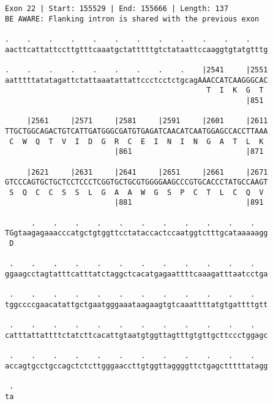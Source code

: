 \documentclass{article}
\begin{document}
\begin{Verbatim}[fontfamily=courier]
Exon 22 | Start: 155529 | End: 155666 | Length: 137
BE AWARE: Flanking intron is shared with the previous exon

.    .    .    .    .    .    .    .    .    .    .    .    
aacttcattattccttgtttcaaatgctatttttgtctataattccaaggtgtatgtttg

.    .    .    .    .    .    .    .    .    |2541     |2551
aatttttatatagattctattaaatattattccctcctctgcagAAACCATCAAGGGCAC
                                              T  I  K  G  T 
                                                       |851 

     |2561     |2571     |2581     |2591     |2601     |2611
TTGCTGGCAGACTGTCATTGATGGGCGATGTGAGATCAACATCAATGGAGCCACCTTAAA
 C  W  Q  T  V  I  D  G  R  C  E  I  N  I  N  G  A  T  L  K 
                         |861                          |871 

     |2621     |2631     |2641     |2651     |2661     |2671
GTCCCAGTGCTGCTCCTCCCTCGGTGCTGCGTGGGGAAGCCCGTGCACCCTATGCCAAGT
 S  Q  C  C  S  S  L  G  A  A  W  G  S  P  C  T  L  C  Q  V 
                         |881                          |891 

      .    .    .    .    .    .    .    .    .    .    .   
TGgtaagagaaacccatgctgtggttcctataccactccaatggtctttgcataaaaagg
 D                                                          

 .    .    .    .    .    .    .    .    .    .    .    .   
ggaagcctagtatttcatttatctaggctcacatgagaattttcaaagatttaatcctga

 .    .    .    .    .    .    .    .    .    .    .    .   
tggccccgaacatattgctgaatgggaaataagaagtgtcaaattttatgtgattttgtt

 .    .    .    .    .    .    .    .    .    .    .    .   
catttattattttctatcttcacattgtaatgtggttagtttgtgttgcttccctggagc

 .    .    .    .    .    .    .    .    .    .    .    .   
accagtgcctgccagctctcttgggaaccttgtggttaggggttctgagctttttatagg

 .
ta
\end{Verbatim}
\newpage
\end{document}
